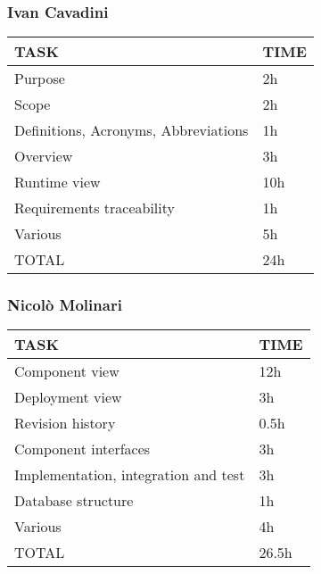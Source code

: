 \hfill
\subsubsection{Ivan Cavadini}
\hfill
\begin{center}
	\begin{tabular}{ | l | p{6cm} | } 
		\hline
		TASK & TIME \\ 
		\hline
		Purpose & 2h  \\ 
		\hline
		Scope & 2h  \\ 
		\hline
		Definitions, Acronyms, Abbreviations & 1h \\ 
		\hline
		Overview & 3h \\ 
		\hline
		Runtime view & 10h \\ 
		\hline
		Requirements traceability & 1h \\ 
		\hline
		Various & 5h  \\ 
		\hline
		TOTAL & 24h \\ 
		\hline
	\end{tabular}
\end{center}
\hfill
\subsubsection{Nicolò Molinari}
\hfill
\begin{center}
	\begin{tabular}{ | l | p{6cm} | } 
		\hline
		TASK & TIME \\ 
		\hline
		Component view & 12h  \\ 
		\hline
		Deployment view & 3h  \\ 
		\hline
		Revision history & 0.5h \\ 
		\hline
		Component interfaces & 3h \\ 
		\hline
		Implementation, integration and test & 3h \\ 
		\hline
		Database structure & 1h   \\ 
		\hline
		Various & 4h \\ 
		\hline
		TOTAL & 26.5h \\ 
		\hline
	\end{tabular}
\end{center}
\hfill
\newpage
